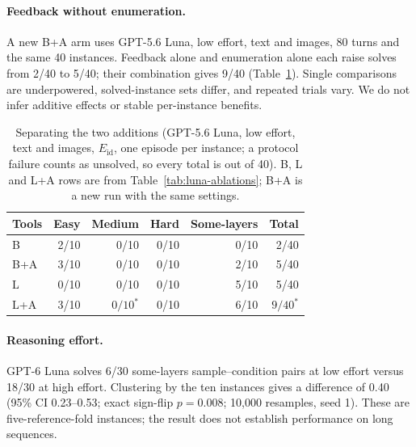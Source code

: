 \paragraph{Feedback without enumeration.}\label{sec:results-feedback-only}
A new B+A arm uses GPT-5.6 Luna, low effort, text and images, 80 turns and the same
40 instances. Feedback alone and enumeration alone each raise solves from 2/40 to 5/40;
their combination gives 9/40 (Table~\ref{tab:feedback-only}). Single comparisons are
underpowered, solved-instance sets differ, and repeated trials vary. We do not infer
additive effects or stable per-instance benefits.
\begin{table}[htbp]
\centering
\caption{Separating the two additions (GPT-5.6 Luna, low effort, text and images, $E_{\mathrm{id}}$,
one episode per instance; a protocol failure counts as unsolved, so every total is out of 40).
B, L and L+A rows are from Table~\ref{tab:luna-ablations}; B+A is a new run with the same settings.}
\label{tab:feedback-only}
\small
\begin{tabular}{lrrrrr}
\hline
Tools & Easy & Medium & Hard & Some-layers & Total \\
\hline
B & 2/10 & 0/10 & 0/10 & 0/10 & 2/40 \\
B+A & 3/10 & 0/10 & 0/10 & 2/10 & 5/40 \\
L & 0/10 & 0/10 & 0/10 & 5/10 & 5/40 \\
L+A & 3/10 & $0/10^{*}$ & 0/10 & 6/10 & $9/40^{*}$ \\
\hline
\end{tabular}
\end{table}
\paragraph{Reasoning effort.}
GPT-6 Luna solves 6/30 some-layers sample--condition pairs at low effort versus 18/30
at high effort. Clustering by the ten instances gives a difference of 0.40
(95\% CI 0.23--0.53; exact sign-flip $p=0.008$; 10,000 resamples, seed 1). These are five-reference-fold
instances; the result does not establish performance on long sequences.

